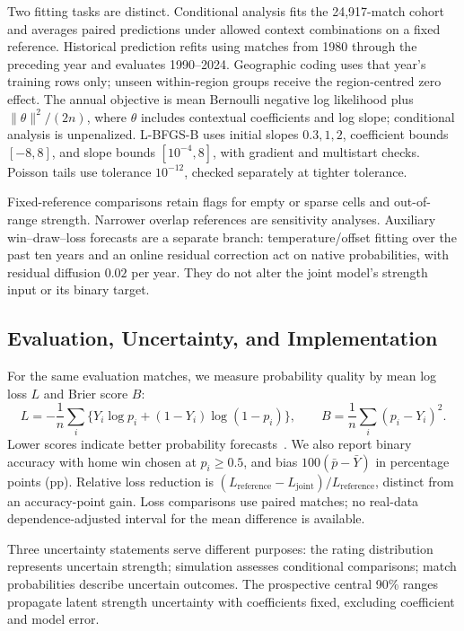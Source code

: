 Two fitting tasks are distinct. Conditional analysis fits the 24,917-match cohort and averages paired predictions under allowed context combinations on a fixed reference. Historical prediction refits using matches from 1980 through the preceding year and evaluates 1990--2024. Geographic coding uses that year's training rows only; unseen within-region groups receive the region-centred zero effect. The annual objective is mean Bernoulli negative log likelihood plus $\|\theta\|^2/(2n)$, where $\theta$ includes contextual coefficients and log slope; conditional analysis is unpenalized. L-BFGS-B uses initial slopes $0.3,1,2$, coefficient bounds $[-8,8]$, and slope bounds $[10^{-4},8]$, with gradient and multistart checks. Poisson tails use tolerance $10^{-12}$, checked separately at tighter tolerance.

Fixed-reference comparisons retain flags for empty or sparse cells and out-of-range strength. Narrower overlap references are sensitivity analyses. Auxiliary win--draw--loss forecasts are a separate branch: temperature/offset fitting over the past ten years and an online residual correction act on native probabilities, with residual diffusion $0.02$ per year. They do not alter the joint model's strength input or its binary target.

\subsection{Evaluation, Uncertainty, and Implementation}
\label{sec:evaluation-method}

For the same evaluation matches, we measure probability quality by mean log loss $L$ and Brier score $B$:
\begin{equation}
 L=-\frac1n\sum_i\{Y_i\log p_i+(1-Y_i)\log(1-p_i)\},\qquad
 B=\frac1n\sum_i(p_i-Y_i)^2.
 \label{eq:probability-scores}
\end{equation}
Lower scores indicate better probability forecasts~\cite{gneiting2007scoring}. We also report binary accuracy with home win chosen at $p_i\geq0.5$, and bias $100(\bar p-\bar Y)$ in percentage points (pp). Relative loss reduction is $(L_{\mathrm{reference}}-L_{\mathrm{joint}})/L_{\mathrm{reference}}$, distinct from an accuracy-point gain. Loss comparisons use paired matches; no real-data dependence-adjusted interval for the mean difference is available.

Three uncertainty statements serve different purposes: the rating distribution represents uncertain strength; simulation assesses conditional comparisons; match probabilities describe uncertain outcomes. The prospective central 90\% ranges propagate latent strength uncertainty with coefficients fixed, excluding coefficient and model error.

